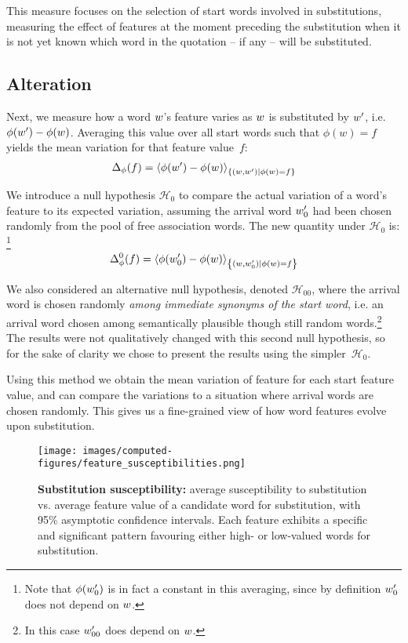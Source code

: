 This measure focuses on the selection of start words involved in substitutions, measuring the effect of features at the moment preceding the substitution when it is not yet known which word in the quotation -- if any -- will be substituted.

\subsection{Alteration}

Next, we measure how a word $w$'s feature varies as $w$ is substituted by $w'$, i.e. $\phi(w') - \phi(w)$.
Averaging this value over all start words such that $\phi(w) = f$ yields the mean variation for that feature value~$f$:
$$\Delta_{\phi}(f) = \left< \phi(w') - \phi(w) \right>_{\left\lbrace (w,w') | \phi(w) = f \right\rbrace}$$

We introduce a null hypothesis $\mathcal{H}_0$ to compare the actual variation of a word's feature to its expected variation, assuming the arrival word $w'_0$ had been chosen randomly from the pool of free association words.
The new quantity under $\mathcal{H}_0$ is:
\footnote{Note that $\phi(w'_0)$ is in fact a constant in this averaging, since by definition $w'_0$ does not depend on $w$.}
$$\Delta_{\phi}^0 (f) = \left< \phi({w'_0}) - \phi(w) \right>_{\left\lbrace (w,w'_0) | \phi(w) = f \right\rbrace}$$

We also considered an alternative null hypothesis, denoted $\mathcal{H}_{00}$, where the arrival word is chosen randomly \emph{among immediate synonyms of the start word}, i.e. an arrival word chosen among semantically plausible though still random words.\footnote{In this case $w'_{00}$ does depend on $w$.}
The results were not qualitatively changed with this second null hypothesis, so for the sake of clarity we chose to present the results using the simpler~$\mathcal{H}_0$.

Using this method we obtain the mean variation of feature for each start feature value, and can compare the variations to a situation where arrival words are chosen randomly.
This gives us a fine-grained view of how word features evolve upon substitution.



\begin{figure*}[!th]
    \centering
    \texttt{[image: images/computed-figures/feature\_susceptibilities.png]}
    \caption{\textbf{Substitution susceptibility:} average susceptibility to substitution vs. average feature value of a candidate word for substitution, with 95\% asymptotic confidence intervals.
    Each feature exhibits a specific and significant pattern favouring either high- or low-valued words for substitution.}
    \label{fig:feature-susceptibilities}
\end{figure*}

